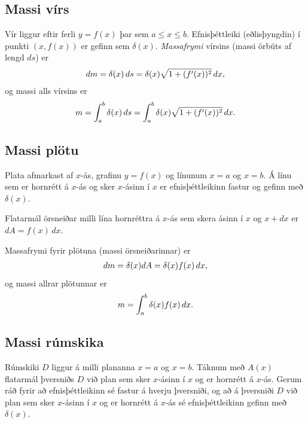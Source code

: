 \documentclass[b5paper,10pt,icelandic]{sphinxmanual}
\begin{document}
\subsection{Massi vírs}
\label{kafli07:massi-virs}\label{kafli07:index-10}
Vír liggur eftir ferli \(y=f(x)\) þar sem \(a\leq x\leq b\).
Efnisþéttleiki (eðlisþyngdin) í punkti \((x, f(x))\) er gefinn sem
\(\delta(x)\). \emph{Massafrymi} vírsins (massi örbúts af lengd
\(ds\)) er
\begin{gather}
\begin{split}dm
= \delta(x)\, ds
=\delta(x)\sqrt{1+(f'(x))^2}\, dx,\end{split}\notag
\end{gather}
og massi alls vírsins er
\begin{gather}
\begin{split}m=\int_a^b \delta(x)\,ds=\int_a^b \delta(x)\sqrt{1+(f'(x))^2}\, dx.\end{split}\notag
\end{gather}

\subsection{Massi plötu}
\label{kafli07:massi-plotu}\label{kafli07:index-11}\label{kafli07:id4}
Plata afmarkast af \(x\)-ás, grafinu \(y=f(x)\) og línunum
\(x=a\) og \(x=b\). Á línu sem er hornrétt á \(x\)-ás og
sker \(x\)-ásinn í \(x\) er efnisþéttleikinn fastur og gefinn
með \(\delta(x)\).

Flatarmál örsneiðar milli lína hornréttra á \(x\)-ás sem skera ásinn
í \(x\) og \(x+dx\) er \(dA=f(x)\,dx\).

Massafrymi fyrir plötuna (massi örsneiðarinnar) er
\begin{gather}
\begin{split}dm =\delta(x)dA = \delta(x) f(x)\,dx,\end{split}\notag
\end{gather}
og massi allrar plötunnar er
\begin{gather}
\begin{split}m=\int_a^b \delta(x)f(x)\,dx.\end{split}\notag
\end{gather}

\subsection{Massi rúmskika}
\label{kafli07:index-12}\label{kafli07:massi-rumskika}
Rúmskiki \(D\) liggur á milli plananna \(x=a\) og \(x=b\).
Táknum með \(A(x)\) flatarmál þversniðs \(D\) við plan sem sker
\(x\)-ásinn í \(x\) og er hornrétt á \(x\)-ás. Gerum ráð
fyrir að efnisþéttleikinn sé fastur á hverju þversniði, og að á
þversniði \(D\) við plan sem sker \(x\)-ásinn í \(x\) og er
hornrétt á \(x\)-ás sé efnisþéttleikinn gefinn með
\(\delta(x)\).
\end{document}
